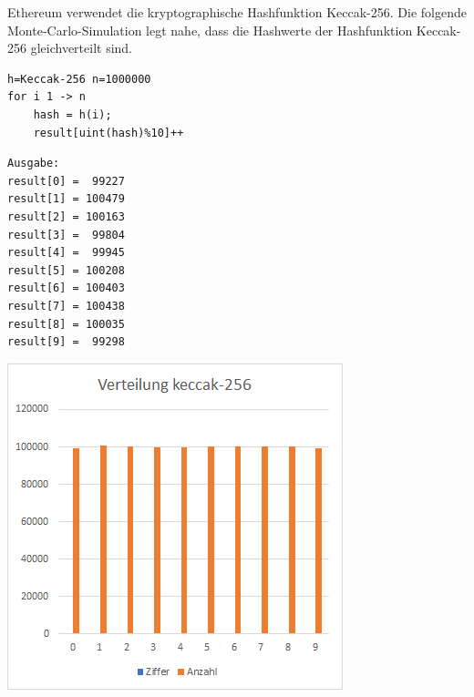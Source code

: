Ethereum verwendet die kryptographische Hashfunktion Keccak-256.
Die folgende Monte-Carlo-Simulation legt nahe, dass die Hashwerte der Hashfunktion Keccak-256 gleichverteilt sind.
\begin{verbatim}
h=Keccak-256 n=1000000
for i 1 -> n
    hash = h(i);
    result[uint(hash)%10]++
\end{verbatim}
\begin{minipage}{0.5\textwidth}
\begin{verbatim}
Ausgabe:
result[0] =  99227
result[1] = 100479
result[2] = 100163
result[3] =  99804
result[4] =  99945
result[5] = 100208
result[6] = 100403
result[7] = 100438
result[8] = 100035
result[9] =  99298
\end{verbatim}
\end{minipage}
\begin{minipage}{0.5\textwidth}
\includegraphics[width=\textwidth]{Figures/verteilung_keccak256}
\centering
\decoRule
{}
\label{fig:verteilung_keccak256}
\end{minipage}

